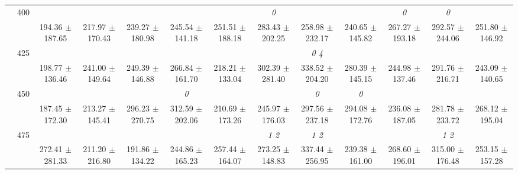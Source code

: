 \begin{table}[h]
{\begin{tabular}{
        ccccccccccccc}
 & \multirow{2}{*}{400}& & & & & & \textit{ 0 }& & & \textit{ 0 }& \textit{ 0 }&  \\ 
 & & 194.36 $\pm$ 187.65& 217.97 $\pm$ 170.43& 239.27 $\pm$ 180.98& 245.54 $\pm$ 141.18& 251.51 $\pm$ 188.18& 283.43 $\pm$ 202.25& 258.98 $\pm$ 232.17& 240.65 $\pm$ 145.82& 267.27 $\pm$ 193.18& 292.57 $\pm$ 244.06& 251.80 $\pm$ 146.92 \\ 
 & \multirow{2}{*}{425}& \cellcolor[HTML]{EFEFEF} & \cellcolor[HTML]{EFEFEF} & \cellcolor[HTML]{EFEFEF} & \cellcolor[HTML]{EFEFEF} & \cellcolor[HTML]{EFEFEF} & \cellcolor[HTML]{EFEFEF} & \cellcolor[HTML]{EFEFEF} \textit{ 0 4 }& \cellcolor[HTML]{EFEFEF} & \cellcolor[HTML]{EFEFEF} & \cellcolor[HTML]{EFEFEF} & \cellcolor[HTML]{EFEFEF}  \\ 
 & & \cellcolor[HTML]{EFEFEF} 198.77 $\pm$ 136.46& \cellcolor[HTML]{EFEFEF} 241.00 $\pm$ 149.64& \cellcolor[HTML]{EFEFEF} 249.39 $\pm$ 146.88& \cellcolor[HTML]{EFEFEF} 266.84 $\pm$ 161.70& \cellcolor[HTML]{EFEFEF} 218.21 $\pm$ 133.04& \cellcolor[HTML]{EFEFEF} 302.39 $\pm$ 281.40& \cellcolor[HTML]{EFEFEF} 338.52 $\pm$ 204.20& \cellcolor[HTML]{EFEFEF} 280.39 $\pm$ 145.15& \cellcolor[HTML]{EFEFEF} 244.98 $\pm$ 137.46& \cellcolor[HTML]{EFEFEF} 291.76 $\pm$ 216.71& \cellcolor[HTML]{EFEFEF} 243.09 $\pm$ 140.65 \\ 
 & \multirow{2}{*}{450}& & & & \textit{ 0 }& & & \textit{ 0 }& \textit{ 0 }& & &  \\ 
 & & 187.45 $\pm$ 172.30& 213.27 $\pm$ 145.41& 296.23 $\pm$ 270.75& 312.59 $\pm$ 202.06& 210.69 $\pm$ 173.26& 245.97 $\pm$ 176.03& 297.56 $\pm$ 237.18& 294.08 $\pm$ 172.76& 236.08 $\pm$ 187.05& 281.78 $\pm$ 233.72& 268.12 $\pm$ 195.04 \\ 
 & \multirow{2}{*}{475}& \cellcolor[HTML]{EFEFEF} & \cellcolor[HTML]{EFEFEF} & \cellcolor[HTML]{EFEFEF} & \cellcolor[HTML]{EFEFEF} & \cellcolor[HTML]{EFEFEF} & \cellcolor[HTML]{EFEFEF} \textit{ 1 2 }& \cellcolor[HTML]{EFEFEF} \textit{ 1 2 }& \cellcolor[HTML]{EFEFEF} & \cellcolor[HTML]{EFEFEF} & \cellcolor[HTML]{EFEFEF} \textit{ 1 2 }& \cellcolor[HTML]{EFEFEF}  \\ 
 & & \cellcolor[HTML]{EFEFEF} 272.41 $\pm$ 281.33& \cellcolor[HTML]{EFEFEF} 211.20 $\pm$ 216.80& \cellcolor[HTML]{EFEFEF} 191.86 $\pm$ 134.22& \cellcolor[HTML]{EFEFEF} 244.86 $\pm$ 165.23& \cellcolor[HTML]{EFEFEF} 257.44 $\pm$ 164.07& \cellcolor[HTML]{EFEFEF} 273.25 $\pm$ 148.83& \cellcolor[HTML]{EFEFEF} 337.44 $\pm$ 256.95& \cellcolor[HTML]{EFEFEF} 239.38 $\pm$ 161.00& \cellcolor[HTML]{EFEFEF} 268.60 $\pm$ 196.01& \cellcolor[HTML]{EFEFEF} 315.00 $\pm$ 176.48& \cellcolor[HTML]{EFEFEF} 253.15 $\pm$ 157.28 \\ 

\end{tabular}}
\end{table}
